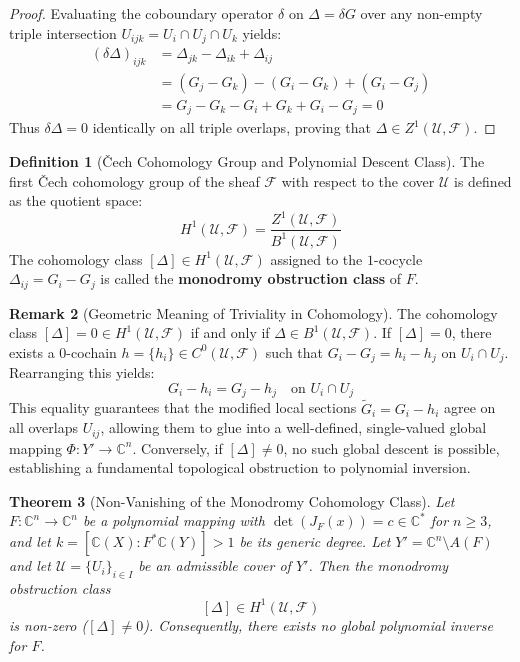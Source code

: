 \documentclass[11pt,reqno]{amsart}
\newtheorem{theorem}{Theorem}[section]
\theoremstyle{definition}
\newtheorem{definition}[theorem]{Definition}
\newtheorem{remark}[theorem]{Remark}
\begin{document}
\begin{proof}
Evaluating the coboundary operator $\delta$ on $\Delta = \delta G$ over any non-empty triple intersection $U_{ijk} = U_i \cap U_j \cap U_k$ yields:
\begin{align*}
(\delta \Delta)_{ijk} &= \Delta_{jk} - \Delta_{ik} + \Delta_{ij} \\
&= (G_j - G_k) - (G_i - G_k) + (G_i - G_j) \\
&= G_j - G_k - G_i + G_k + G_i - G_j = 0
\end{align*}
Thus $\delta \Delta = 0$ identically on all triple overlaps, proving that $\Delta \in Z^1(\mathcal{U}, \mathcal{F})$.
\end{proof}

\begin{definition}[\v{C}ech Cohomology Group and Polynomial Descent Class]
The first \v{C}ech cohomology group of the sheaf $\mathcal{F}$ with respect to the cover $\mathcal{U}$ is defined as the quotient space:
$$H^1(\mathcal{U}, \mathcal{F}) = \frac{Z^1(\mathcal{U}, \mathcal{F})}{B^1(\mathcal{U}, \mathcal{F})}$$
The cohomology class $[\Delta] \in H^1(\mathcal{U}, \mathcal{F})$ assigned to the $1$-cocycle $\Delta_{ij} = G_i - G_j$ is called the \textbf{monodromy obstruction class} of $F$. 
\end{definition}

\begin{remark}[Geometric Meaning of Triviality in Cohomology]
The cohomology class $[\Delta] = 0 \in H^1(\mathcal{U}, \mathcal{F})$ if and only if $\Delta \in B^1(\mathcal{U}, \mathcal{F})$. If $[\Delta] = 0$, there exists a $0$-cochain $h = \{h_i\} \in C^0(\mathcal{U}, \mathcal{F})$ such that $G_i - G_j = h_i - h_j$ on $U_i \cap U_j$. Rearranging this yields:
$$G_i - h_i = G_j - h_j \quad \text{on } U_i \cap U_j$$
This equality guarantees that the modified local sections $\tilde{G}_i = G_i - h_i$ agree on all overlaps $U_{ij}$, allowing them to glue into a well-defined, single-valued global mapping $\Phi: Y' \to \mathbb{C}^n$. Conversely, if $[\Delta] \neq 0$, no such global descent is possible, establishing a fundamental topological obstruction to polynomial inversion.
\end{remark}

\begin{theorem}[Non-Vanishing of the Monodromy Cohomology Class]
Let $F: \mathbb{C}^n \to \mathbb{C}^n$ be a polynomial mapping with $\det(J_F(x)) = c \in \mathbb{C}^*$ for $n \ge 3$, and let $k = [\mathbb{C}(X) : F^*\mathbb{C}(Y)] > 1$ be its generic degree. Let $Y' = \mathbb{C}^n \setminus A(F)$ and let $\mathcal{U} = \{U_i\}_{i \in I}$ be an admissible cover of $Y'$. Then the monodromy obstruction class 
$$[\Delta] \in H^1(\mathcal{U}, \mathcal{F})$$
is non-zero ($[\Delta] \neq 0$). Consequently, there exists no global polynomial inverse for $F$.
\end{theorem}
\end{document}
